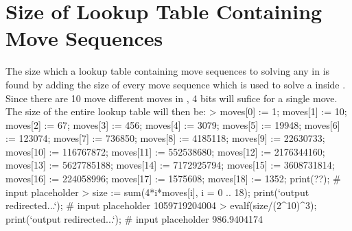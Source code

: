 \chapter{Size of Lookup Table Containing Move Sequences}
\label{chap:sizeOfLookUp}
The size which a lookup table containing move sequences to solving any \cube{} in  is found by adding the size of every move sequence which is used to solve a \cube{} inside .
Since there are 10 move different moves in , 4 bits will sufice for a single move.
The size of the entire lookup table will then be:
> moves[0] := 1; moves[1] := 10; moves[2] := 67; moves[3] := 456; moves[4] := 3079; moves[5] := 19948; moves[6] := 123074; moves[7] := 736850; moves[8] := 4185118; moves[9] := 22630733; moves[10] := 116767872; moves[11] := 552538680; moves[12] := 2176344160; moves[13] := 5627785188; moves[14] := 7172925794; moves[15] := 3608731814; moves[16] := 224058996; moves[17] := 1575608; moves[18] := 1352;
print(??); # input placeholder
> size := sum(4*i*moves[i], i = 0 .. 18);
print(`output redirected...`); # input placeholder
                                1059719204004
> evalf(size/(2^10)^3);
print(`output redirected...`); # input placeholder
                                 986.9404174
